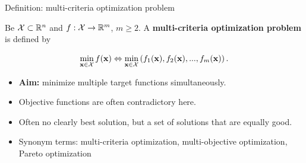 \begin{frame}{Definition: multi-criteria optimization problem}

Be $\mathcal{X} \subset \mathbb{R}^n$ and $f: \mathcal{X} \to \mathbb{R}^m$, $m \ge 2$. A \textbf{multi-criteria optimization problem} is defined by

$$
\min_{\mathbf{x} \in \mathcal{X}}  f(\mathbf{x}) \Leftrightarrow \min_{\mathbf{x} \in \mathcal{X}} \left(f_1(\mathbf{x}), f_2(\mathbf{x}), ..., f_m(\mathbf{x})\right).
$$

\begin{itemize}
\item \textbf{Aim: } minimize multiple target functions simultaneously.
\item Objective functions are often contradictory here.
\item Often no clearly best solution, but a set of solutions that are equally good.
\item Synonym terms: multi-criteria optimization, multi-objective optimization, Pareto optimization
\end{itemize}

\end{frame}


